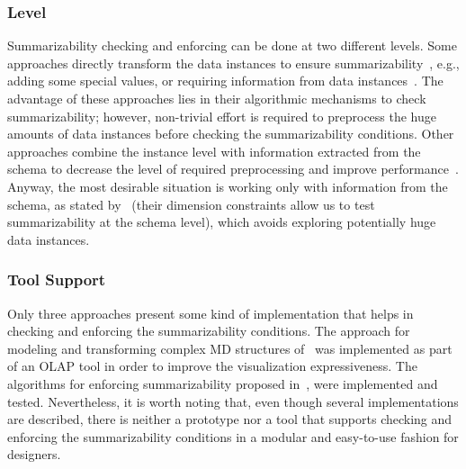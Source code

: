 \subsubsection{Level} Summarizability checking and enforcing can be done
at two different levels. Some approaches directly transform the data
instances to ensure
summarizability~\cite{DBLP:journals/is/PedersenJD01}, e.g., adding
some special values, or requiring information from data
instances~\cite{DBLP:conf/dmdw/HusemannLV00,DBLP:conf/dmdw/SongRME01}.
The advantage of these approaches lies in their algorithmic
mechanisms to check summarizability; however, non-trivial effort is
required to preprocess the huge amounts of data instances before
checking the summarizability conditions. Other approaches combine
the instance level with information extracted from the schema to
decrease the level of required preprocessing and improve
performance~\cite{DBLP:journals/dss/PratAC06,MansmannIJDWDM07,DBLP:journals/dke/MalinowskiZ06}.
Anyway, the most desirable situation is working only with
information from the schema, as stated
by~\cite{DBLP:journals/tods/HurtadoGM05} (their dimension
constraints allow us to test summarizability at the schema level),
which avoids exploring potentially huge data instances.

\subsubsection{Tool Support}
Only three approaches present some kind of implementation that helps
in checking and enforcing the summarizability conditions. The
approach for modeling and transforming complex MD structures
of~\cite{MansmannIJDWDM07} was implemented as part of an OLAP tool
in order to improve the visualization expressiveness. The algorithms
for enforcing summarizability proposed
in~\cite{DBLP:journals/tods/HurtadoGM05,DBLP:journals/is/PedersenJD01},
were implemented and tested. Nevertheless, it is worth noting that,
even though several implementations are described, there is neither
a prototype nor a tool that supports checking and enforcing the
summarizability conditions in a modular and easy-to-use fashion for
designers.

